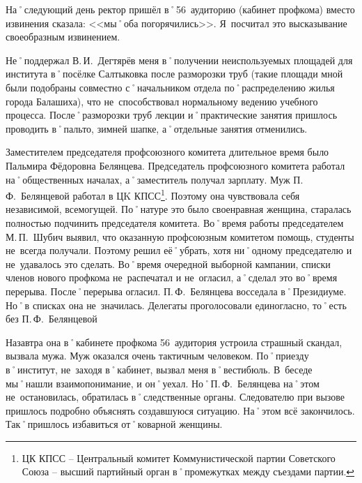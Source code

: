 На˚следующий день ректор пришёл в˚56~аудиторию (кабинет профкома) вместо извинения сказала: <<мы˚оба погорячились>>. Я~посчитал это высказывание своеобразным извинением.

Не˚поддержал В.\,И.~Дегтярёв меня в˚получении неиспользуемых площадей для института в˚посёлке Салтыковка после разморозки труб (такие площади мной были подобраны совместно с˚начальником отдела по˚распределению жилья города Балашиха), что не~способствовал нормальному ведению учебного процесса. После˚разморозки труб лекции и˚практические занятия пришлось проводить в˚пальто, зимней шапке, а˚отдельные занятия отменились.

Заместителем председателя профсоюзного комитета длительное время было Пальмира Фёдоровна Белянцева. Председатель профсоюзного комитета работал на˚общественных началах, а˚заместитель получал зарплату. Муж П.\,Ф.~Белянцевой работал в ЦK КПСС\footnote{ЦК КПСС \--- Центральный комитет Коммунистической партии Советского Союза \--- высший партийный орган в˚промежутках между съездами партии.}. Поэтому она чувствовала себя независимой, всемогущей. По˚натуре это было своенравная женщина, старалась полностью подчинить председателя комитета. Во˚время работы председателем М.\,П.~Шубич выявил, что оказанную профсоюзным комитетом помощь, студенты не~всегда получали. Поэтому решил её˚убрать, хотя ни˚одному председателю и не~удавалось это сделать. Во˚время очередной выборной кампании, списки членов нового профкома не~распечатал и не~огласил, а˚сделал это во˚время перерыва. После˚перерыва огласил. П.\,Ф.~Белянцева восседала в˚Президиуме. Но˚в списках она не~значилась. Делегаты проголосовали единогласно, то˚есть без П.\,Ф.~Белянцевой 

Назавтра она в˚кабинете профкома 56~аудитория устроила страшный скандал, вызвала мужа. Муж оказался очень тактичным человеком. По˚приезду в˚институт, не~заходя в˚кабинет, вызвал меня в˚вестибюль. В~беседе мы˚нашли взаимопонимание, и он˚уехал. Но˚П.\,Ф.~Белянцева на˚этом не~остановилась, обратилась в˚следственные органы. Следователю при вызове пришлось подробно объяснять создавшуюся ситуацию. На˚этом всё закончилось. Так˚пришлось избавиться от˚коварной женщины. 

